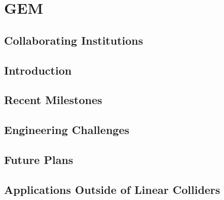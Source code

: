 \section{GEM}
\subsection{Collaborating Institutions}
\subsection{Introduction}
\subsection{Recent Milestones}
\subsection{Engineering Challenges}
\subsection{Future Plans}
\subsection{Applications Outside of Linear Colliders}
